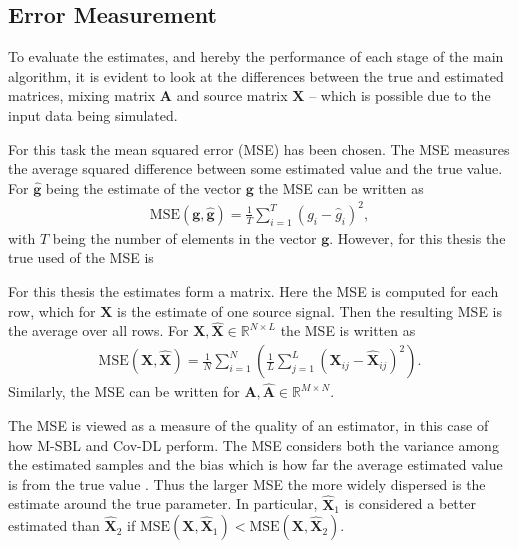 \subsection{Error Measurement}\label{sec:mse}  
To evaluate the estimates, and hereby the performance of each stage of the main algorithm, it is evident to look at the differences between the true and estimated matrices, mixing matrix $\mathbf{A}$ and source matrix $\mathbf{X}$ -- which is possible due to the input data being simulated. 

For this task the mean squared error (MSE) has been chosen. 
The MSE measures the average squared difference between some estimated value and the true value. 
For $\hat{\textbf{g}}$ being the estimate of the vector $\textbf{g}$ the MSE can be written as 
\begin{align*}
\text{MSE}(\textbf{g},\hat{\textbf{g}}) = \frac{1}{T} \sum_{i=1}^T (g_i - \hat{g}_i)^2, 
\end{align*}
with $T$ being the number of elements in the vector $\textbf{g}$. 
However, for this thesis the true used of the MSE is

For this thesis the estimates form a matrix. 
Here the MSE is computed for each row, which for $\mathbf{X}$ is the estimate of one source signal. 
Then the resulting MSE is the average over all rows. 
For $\mathbf{X}, \hat{\mathbf{X}} \in \mathbb{R}^{N \times L}$ the MSE is written as 
\begin{align*}
\text{MSE}(\mathbf{X},\hat{\mathbf{X}}) = \frac{1}{N} \sum_{i=1}^{N} \left( \frac{1}{L} \sum_{j=1}^L (\mathbf{X}_{ij} - \hat{\mathbf{X}}_{ij})^2\right).  
\end{align*}
Similarly, the MSE can be written for $\mathbf{A},\hat{\mathbf{A}} \in \mathbb{R}^{M \times N}$.  

The MSE is viewed as a measure of the quality of an estimator, in this case of how M-SBL and Cov-DL perform. 
The MSE considers both the variance among the estimated samples and the bias which is how far the average estimated value is from the true value \cite[p.305]{MSE_book}.  
Thus the larger MSE the more widely dispersed is the estimate around the true parameter.
In particular, $\hat{\mathbf{X}}_1$ is considered  a better estimated than $\hat{\mathbf{X}}_2$ if $\text{MSE}(\mathbf{X},\hat{\mathbf{X}}_1)< \text{MSE}(\mathbf{X},\hat{\mathbf{X}}_2)$. 

